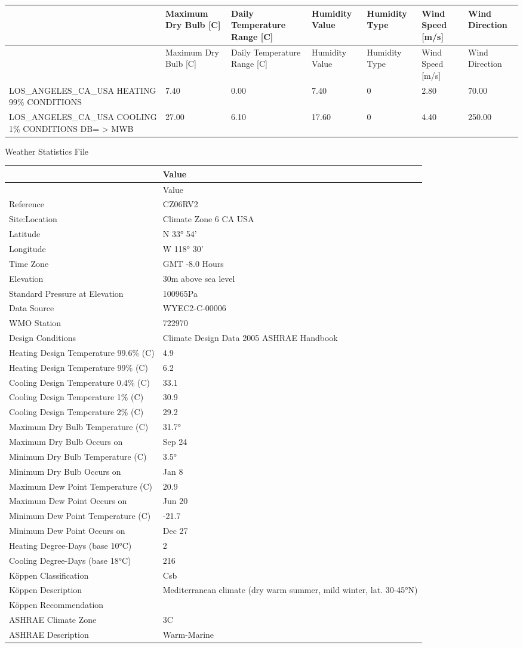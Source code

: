 {\scriptsize
\begin{longtable}[c]{>{\raggedright}p{1.2in}>{\raggedright}p{0.7in}>{\raggedright}p{0.7in}>{\raggedright}p{0.7in}>{\raggedright}p{0.7in}>{\raggedright}p{0.7in}>{\raggedright}p{0.7in}}
\toprule
~ & Maximum Dry Bulb [C] & Daily Temperature Range [C] & Humidity Value & Humidity Type & Wind Speed [m/s] & Wind Direction \tabularnewline
\midrule
\endfirsthead

\toprule
~ & Maximum Dry Bulb [C] & Daily Temperature Range [C] & Humidity Value & Humidity Type & Wind Speed [m/s] & Wind Direction \tabularnewline
\midrule
\endhead

LOS\-\_ANGELES\-\_CA\-\_USA HEATING 99\% CONDITIONS & 7.40 & 0.00 & 7.40 & 0 & 2.80 & 70.00 \tabularnewline
LOS\-\_ANGELES\-\_CA\-\_USA COOLING 1\% CONDITIONS DB= > MWB & 27.00 & 6.10 & 17.60 & 0 & 4.40 & 250.00 \tabularnewline
\bottomrule
\end{longtable}}

Weather Statistics File

\begin{longtable}[c]{>{\raggedright}p{2.15in}>{\raggedright}p{3.84in}}
\toprule
~ & Value \tabularnewline
\midrule
\endfirsthead

\toprule
~ & Value \tabularnewline
\midrule
\endhead

Reference & CZ06RV2 \tabularnewline
Site:Location & Climate Zone 6 CA USA \tabularnewline
Latitude & N 33° 54' \tabularnewline
Longitude & W 118° 30' \tabularnewline
Time Zone & GMT -8.0 Hours \tabularnewline
Elevation & 30m above sea level \tabularnewline
Standard Pressure at Elevation & 100965Pa \tabularnewline
Data Source & WYEC2-C-00006 \tabularnewline
WMO Station & 722970 \tabularnewline
Design Conditions & Climate Design Data 2005 ASHRAE Handbook \tabularnewline
Heating Design Temperature 99.6\% (C) & 4.9 \tabularnewline
Heating Design Temperature 99\% (C) & 6.2 \tabularnewline
Cooling Design Temperature 0.4\% (C) & 33.1 \tabularnewline
Cooling Design Temperature 1\% (C) & 30.9 \tabularnewline
Cooling Design Temperature 2\% (C) & 29.2 \tabularnewline
Maximum Dry Bulb Temperature (C) & 31.7° \tabularnewline
Maximum Dry Bulb Occurs on & Sep 24 \tabularnewline
Minimum Dry Bulb Temperature (C) & 3.5° \tabularnewline
Minimum Dry Bulb Occurs on & Jan 8 \tabularnewline
Maximum Dew Point Temperature (C) & 20.9 \tabularnewline
Maximum Dew Point Occurs on & Jun 20 \tabularnewline
Minimum Dew Point Temperature (C) & -21.7 \tabularnewline
Minimum Dew Point Occurs on & Dec 27 \tabularnewline
Heating Degree-Days (base 10°C) & 2 \tabularnewline
Cooling Degree-Days (base 18°C) & 216 \tabularnewline
Köppen Classification & Csb \tabularnewline
Köppen Description & Mediterranean climate (dry warm summer, mild winter, lat. 30-45°N) \tabularnewline
Köppen Recommendation & ~ \tabularnewline
ASHRAE Climate Zone & 3C \tabularnewline
ASHRAE Description & Warm-Marine \tabularnewline
\bottomrule
\end{longtable}


